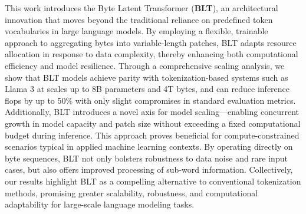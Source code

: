 This work introduces the Byte Latent Transformer (\textbf{BLT}), an architectural innovation that moves beyond the traditional reliance on predefined token vocabularies in large language models. By employing a flexible, trainable approach to aggregating bytes into variable-length patches, {\textsc BLT} adapts resource allocation in response to data complexity, thereby enhancing both computational efficiency and model resilience. Through a comprehensive scaling analysis, we show that {\textsc BLT} models achieve parity with tokenization-based systems such as Llama 3 at scales up to 8B parameters and 4T bytes, and can reduce inference flops by up to 50\% with only slight compromises in standard evaluation metrics. Additionally, {\textsc BLT} introduces a novel axis for model scaling—enabling concurrent growth in model capacity and patch size without exceeding a fixed computational budget during inference. This approach proves beneficial for compute-constrained scenarios typical in applied machine learning contexts. By operating directly on byte sequences, {\textsc BLT} not only bolsters robustness to data noise and rare input cases, but also offers improved processing of sub-word information. Collectively, our results highlight {\textsc BLT} as a compelling alternative to conventional tokenization methods, promising greater scalability, robustness, and computational adaptability for large-scale language modeling tasks.

